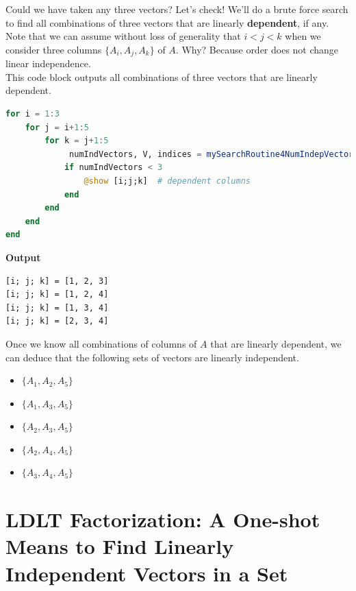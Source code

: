Could we have taken any three vectors? Let's check! We'll do a brute force search to find all combinations of three vectors that are linearly \textbf{dependent}, if any. Note that we can assume without loss of generality that $i < j < k$ when we consider three columns $\{A_i, A_j, A_k \}$ of $A$. Why? Because order does not change linear independence. \\

This code block outputs all combinations of three vectors that are linearly dependent.  \\

\begin{lstlisting}[language=Julia,style=mystyle]
for i = 1:3
    for j = i+1:5
        for k = j+1:5
             numIndVectors, V, indices = mySearchRoutine4NumIndepVectors(A[:,[i;j;k]])
            if numIndVectors < 3 
                @show [i;j;k]  # dependent columns              
            end
        end
    end
end
\end{lstlisting}
\textbf{Output}
\begin{verbatim}
[i; j; k] = [1, 2, 3]
[i; j; k] = [1, 2, 4]
[i; j; k] = [1, 3, 4]
[i; j; k] = [2, 3, 4]
\end{verbatim}

Once we know all combinations of columns of $A$ that are linearly dependent, we can deduce that the following sets of vectors are linearly independent.
\begin{itemize}
    \item  $\{A_1, A_2, A_5 \}$ 
    \item  $\{A_1, A_3, A_5 \}$ 
    \item  $\{A_2, A_3, A_5 \}$ 
    \item  $\{A_2, A_4, A_5 \}$ 
     \item  $\{A_3, A_4, A_5 \}$ 
\end{itemize}

\section{LDLT Factorization: A One-shot Means to Find Linearly Independent Vectors in a Set}


